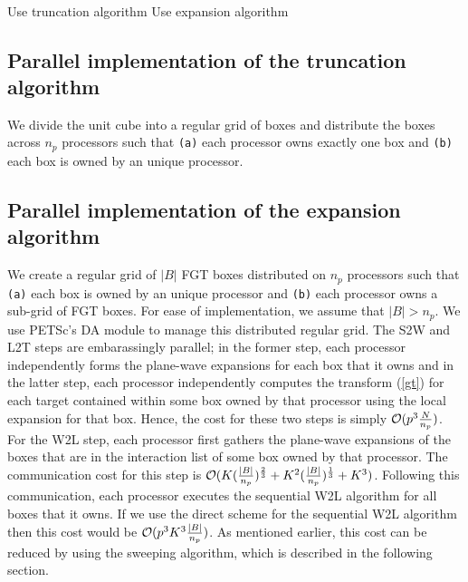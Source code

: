{\tt
\begin{algorithmic}
\STATE
     \STATE Use truncation algorithm 
  \ELSE 
     \STATE Use expansion algorithm
  \ENDIF
\STATE
\end{algorithmic}
}


\subsection{Parallel implementation of the truncation algorithm}
We divide the unit cube into a regular grid of boxes and distribute the boxes across $n_p$ processors
 such that {\tt{(a)}} each processor owns exactly one box and {\tt{(b)}} each box is owned by an unique processor.

\subsection{Parallel implementation of the expansion algorithm} 
We create a regular grid of $|B|$ FGT boxes distributed on $n_p$ processors 
such that {\tt{(a)}} each box is owned by an unique processor and {\tt{(b)}} each processor owns a 
sub-grid of FGT boxes. For ease of implementation, we assume that $|B| > n_p$. 
 We use PETSc's \cite{petsc-user-ref, petsc-home-page} DA module to manage this distributed regular grid.
 The S2W and L2T steps are embarassingly parallel; in the former step, each processor independently forms the 
 plane-wave expansions for each box that it owns and in the latter step, each processor
 independently computes the transform (\ref{gt}) for each target contained within some box owned by
  that processor using the local expansion for that box. Hence, the cost for these two steps is 
  simply $\mathcal{O}(p^3 \frac{N}{n_p})$. For the W2L step, each processor first gathers the plane-wave expansions of
  the boxes that are in the interaction list of some box owned by that processor. The communication cost for
  this step is $\mathcal{O}(K (\frac{|B|}{n_p})^{\frac{2}{3}} + K^2(\frac{|B|}{n_p})^{\frac{1}{3}} + K^3 )$.
Following this communication, each processor executes the sequential W2L algorithm for all boxes that it owns. 
 If we use the direct scheme for the sequential W2L algorithm then this cost would be $\mathcal{O}(p^3 K^3 \frac{|B|}{n_p})$.
 As mentioned earlier, this cost can be reduced by using the sweeping algorithm, which is described in the following section. 


